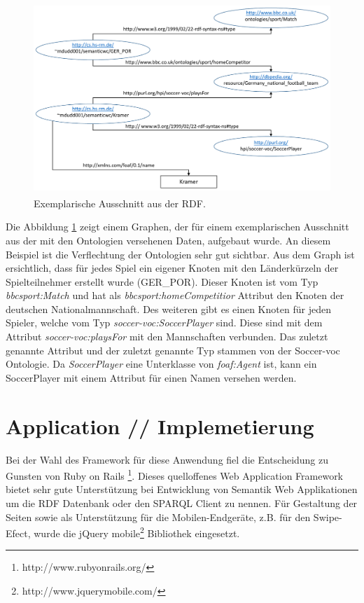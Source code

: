 \documentclass[runningheads,a4paper]{llncs}
\begin{document}
\begin{figure}
\centering
\includegraphics[height=7.2cm]{graph_manus}
\caption{Exemplarische Ausschnitt aus der RDF.}
\label{fig:example}
\end{figure}

Die Abbildung \ref{fig:example} zeigt einem Graphen, der für einem exemplarischen Ausschnitt aus der mit den Ontologien versehenen Daten, aufgebaut wurde. An diesem Beispiel ist die Verflechtung der Ontologien sehr gut sichtbar.
Aus dem Graph ist ersichtlich, dass für jedes Spiel ein eigener Knoten mit den Länderkürzeln der Spielteilnehmer erstellt wurde (GER_POR). Dieser Knoten ist vom Typ \textit{bbcsport:Match} und hat als \textit{bbcsport:homeCompetitior} Attribut den Knoten der deutschen Nationalmannschaft. 
Des weiteren gibt es einen Knoten für jeden Spieler, welche vom Typ \textit{soccer-voc:SoccerPlayer} sind. Diese sind mit dem Attribut \textit{soccer-voc:playsFor} mit den Mannschaften verbunden. Das zuletzt genannte Attribut und der zuletzt genannte Typ stammen von der Soccer-voc Ontologie. Da \textit{SoccerPlayer} eine Unterklasse von \textit{foaf:Agent} ist, kann ein SoccerPlayer mit einem Attribut für einen Namen versehen werden.
\newpage
\section{Application // Implemetierung}


Bei der Wahl des Framework für diese Anwendung fiel die Entscheidung zu Gunsten von Ruby on Rails \footnote{http://www.rubyonrails.org/}. Dieses quelloffenes Web Application Framework bietet sehr gute Unterstützung bei Entwicklung von Semantik Web Applikationen um die RDF Datenbank oder den SPARQL Client zu nennen. Für Gestaltung der Seiten sowie als Unterstützung für die Mobilen-Endgeräte, z.B. für den Swipe-Efect,  wurde die jQuery mobile\footnote{http://www.jquerymobile.com/} Bibliothek eingesetzt. 
\end{document}
